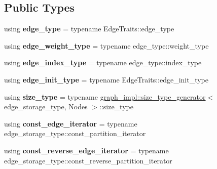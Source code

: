 \subsection*{Public Types}
\begin{DoxyCompactItemize}
\item 
\mbox{\label{classsequoia_1_1maths_1_1graph__primitive_ab1e4796db67d1ee283a16c7ac4ae4747}} 
using {\bfseries edge\+\_\+type} = typename Edge\+Traits\+::edge\+\_\+type
\item 
\mbox{\label{classsequoia_1_1maths_1_1graph__primitive_aad12810028f45979410db99fc0e573bc}} 
using {\bfseries edge\+\_\+weight\+\_\+type} = typename edge\+\_\+type\+::weight\+\_\+type
\item 
\mbox{\label{classsequoia_1_1maths_1_1graph__primitive_acabf76a52e8025cc06e4863eb13f0592}} 
using {\bfseries edge\+\_\+index\+\_\+type} = typename edge\+\_\+type\+::index\+\_\+type
\item 
\mbox{\label{classsequoia_1_1maths_1_1graph__primitive_a3bccaa0a8e742994800cab7e1be2a8e3}} 
using {\bfseries edge\+\_\+init\+\_\+type} = typename Edge\+Traits\+::edge\+\_\+init\+\_\+type
\item 
\mbox{\label{classsequoia_1_1maths_1_1graph__primitive_aa2ca8a5c8206cf5928287159a4cbde78}} 
using {\bfseries size\+\_\+type} = typename \mbox{\hyperlink{structsequoia_1_1maths_1_1graph__impl_1_1size__type__generator}{graph\+\_\+impl\+::size\+\_\+type\+\_\+generator}}$<$ edge\+\_\+storage\+\_\+type, Nodes $>$\+::size\+\_\+type
\item 
\mbox{\label{classsequoia_1_1maths_1_1graph__primitive_ac6abaabbafe8181ac639c074a8d2d2c3}} 
using {\bfseries const\+\_\+edge\+\_\+iterator} = typename edge\+\_\+storage\+\_\+type\+::const\+\_\+partition\+\_\+iterator
\item 
\mbox{\label{classsequoia_1_1maths_1_1graph__primitive_a55cb18bf16295db0f953d45c57bdd7de}} 
using {\bfseries const\+\_\+reverse\+\_\+edge\+\_\+iterator} = typename edge\+\_\+storage\+\_\+type\+::const\+\_\+reverse\+\_\+partition\+\_\+iterator
\end{DoxyCompactItemize}
